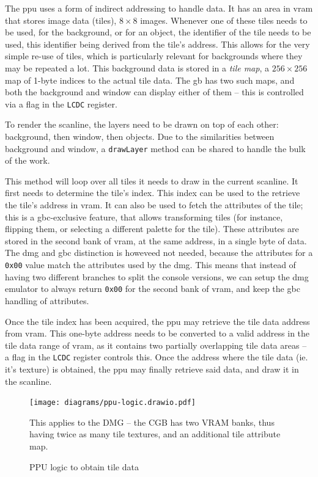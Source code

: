 \documentclass[11pt]{informatics-report}
\begin{document}
The \gls{ppu} uses a form of indirect addressing to handle data. It has an area in \gls{vram} that stores image data (tiles), $8 \times 8$ images. Whenever one of these tiles needs to be used, for the background, or for an object, the identifier of the tile needs to be used, this identifier being derived from the tile's address. This allows for the very simple re-use of tiles, which is particularly relevant for backgrounds where they may be repeated a lot. This background data is stored in a \textit{tile map}, a $256 \times 256$ map of 1-byte indices to the actual tile data. The \gls{gb} has two such maps, and both the background and window can display either of them -- this is controlled via a flag in the \texttt{LCDC} register.

To render the scanline, the layers need to be drawn on top of each other: background, then window, then objects. Due to the similarities between background and window, a \texttt{drawLayer} method can be shared to handle the bulk of the work.

This method will loop over all tiles it needs to draw in the current scanline. It first needs to determine the tile's index. This index can be used to the retrieve the tile's address in \gls{vram}. It can also be used to fetch the attributes of the tile; this is a \gls{gbc}-exclusive feature, that allows transforming tiles (for instance, flipping them, or selecting a different palette for the tile). These attributes are stored in the second bank of \gls{vram}, at the same address, in a single byte of data. The \gls{dmg} and \gls{gbc} distinction is howeveed not needed, because the attributes for a \texttt{0x00} value match the attributes used by the \gls{dmg}. This means that instead of having two different branches to split the console versions, we can setup the \gls{dmg} emulator to always return \texttt{0x00} for the second bank of \gls{vram}, and keep the \gls{gbc} handling of attributes.

Once the tile index has been acquired, the \gls{ppu} may retrieve the tile data address from \gls{vram}. This one-byte address needs to be converted to a valid address in the tile data range of \gls{vram}, as it contains two partially overlapping tile data areas -- a flag in the \texttt{LCDC} register controls this. Once the address where the tile data (ie. it's texture) is obtained, the \gls{ppu} may finally retrieve said data, and draw it in the scanline.

\begin{figure}[h]
    \centering
    \texttt{[image: diagrams/ppu-logic.drawio.pdf]}
    \caption{PPU logic to obtain tile data}
	This applies to the DMG -- the CGB has two VRAM banks, thus having twice as many tile textures, and an additional tile attribute map.
    \label{fig:emu-core-components}
\end{figure}
\end{document}
